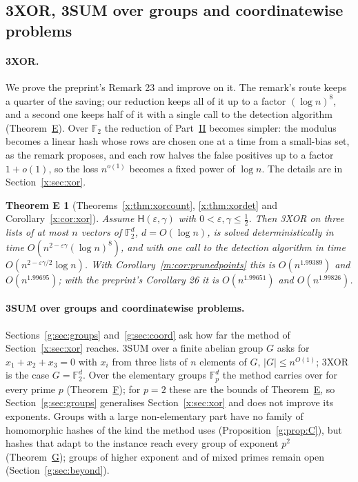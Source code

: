 \documentclass[11pt]{article}
\newtheorem*{theoremE}{Theorem E}
\theoremstyle{definition}
\theoremstyle{remark}
\newcommand{\F}{\mathbb{F}_2}
\newcommand{\Fp}{\mathbb{F}_p}
\newcommand{\Hyp}{\mathsf{H}}
\newcommand{\ExpBestUp}{1.99389}%
\newcommand{\ExpHalfBestUp}{1.99695}%
\begin{document}
\subsection{3XOR, 3SUM over groups and coordinatewise problems}\label{m:sec:intro:beyond}

\paragraph{3XOR.} We prove the preprint's Remark 23 and improve on it. The remark's route keeps a quarter of the saving; our reduction keeps all of it up to a factor $(\log n)^8$, and a second one keeps half of it with a single call to the detection algorithm (Theorem~\hyperref[m:introE]{E}). Over $\mathbb F_2$ the reduction of Part~\hyperref[m:partII]{II} becomes simpler: the modulus becomes a linear hash whose rows are chosen one at a time from a small-bias set, as the remark proposes, and each row halves the false positives up to a factor $1+o(1)$, so the loss $n^{o(1)}$ becomes a fixed power of $\log n$. The details are in Section~\ref{x:sec:xor}.

\label{m:introE}\begin{theoremE}[Theorems~\ref{x:thm:xorcount}, \ref{x:thm:xordet} and Corollary~\ref{x:cor:xor}]
Assume $\Hyp(\varepsilon,\gamma)$ with $0<\varepsilon,\gamma\le\frac12$. Then 3XOR on three lists of at most $n$ vectors of $\mathbb F_2^d$, $d=O(\log n)$, is solved deterministically in time $O(n^{2-\varepsilon\gamma}(\log n)^8)$, and with one call to the detection algorithm in time $O(n^{2-\varepsilon\gamma/2}\log n)$. With Corollary~\ref{m:cor:prunedpoints} this is $O(n^{\ExpBestUp})$ and $O(n^{\ExpHalfBestUp})$; with the preprint's Corollary 26 it is $O(n^{1.99651})$ and $O(n^{1.99826})$.
\end{theoremE}

\paragraph{3SUM over groups and coordinatewise problems.} Sections~\ref{g:sec:groups} and~\ref{g:sec:coord} ask how far the method of Section~\ref{x:sec:xor} reaches. 3SUM over a finite abelian group $G$ asks for $x_1+x_2+x_3=0$ with $x_i$ from three lists of $n$ elements of $G$, $|G|\le n^{O(1)}$; 3XOR is the case $G=\F^d$. Over the elementary groups $\Fp^d$ the method carries over for every prime $p$ (Theorem~\hyperref[m:introF]{F}); for $p=2$ these are the bounds of Theorem~\hyperref[m:introE]{E}, so Section~\ref{g:sec:groups} generalises Section~\ref{x:sec:xor} and does not improve its exponents. Groups with a large non-elementary part have no family of homomorphic hashes of the kind the method uses (Proposition~\ref{g:prop:C}), but hashes that adapt to the instance reach every group of exponent $p^2$ (Theorem~\hyperref[m:introG]{G}); groups of higher exponent and of mixed primes remain open (Section~\ref{g:sec:beyond}).
\end{document}
